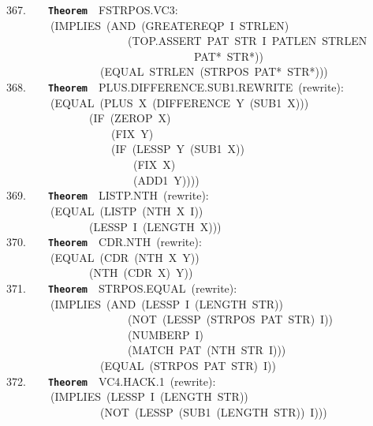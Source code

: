 \documentclass[11pt]{book}
\newenvironment{pubasis}{\begin{flushleft}\ttfamily\small}{\normalsize\rmfamily\end{flushleft}}
\newcommand{\axiomordefinition}[1]{\vspace{6pt}\texttt{\textbf{#1}}}
\begin{document}
\begin{pubasis}
367.~~~~\axiomordefinition{Theorem}~~FSTRPOS.VC3:\\
~~~~~~~~(IMPLIES~(AND~(GREATEREQP~I~STRLEN)\\
~~~~~~~~~~~~~~~~~~~~~~(TOP.ASSERT~PAT~STR~I~PATLEN~STRLEN\\
~~~~~~~~~~~~~~~~~~~~~~~~~~~~~~~~~~PAT*~STR*))\\
~~~~~~~~~~~~~~~~~(EQUAL~STRLEN~(STRPOS~PAT*~STR*)))\\

368.~~~~\axiomordefinition{Theorem}~~PLUS.DIF\-FER\-ENCE.SUB1.REWRITE~(rewrite):\\
~~~~~~~~(EQUAL~(PLUS~X~(DIFFERENCE~Y~(SUB1~X)))\\
~~~~~~~~~~~~~~~(IF~(ZEROP~X)\\
~~~~~~~~~~~~~~~~~~~(FIX~Y)\\
~~~~~~~~~~~~~~~~~~~(IF~(LESSP~Y~(SUB1~X))\\
~~~~~~~~~~~~~~~~~~~~~~~(FIX~X)\\
~~~~~~~~~~~~~~~~~~~~~~~(ADD1~Y))))\\

369.~~~~\axiomordefinition{Theorem}~~LISTP.NTH~(rewrite):\\
~~~~~~~~(EQUAL~(LISTP~(NTH~X~I))\\
~~~~~~~~~~~~~~~(LESSP~I~(LENGTH~X)))\\

370.~~~~\axiomordefinition{Theorem}~~CDR.NTH~(rewrite):\\
~~~~~~~~(EQUAL~(CDR~(NTH~X~Y))\\
~~~~~~~~~~~~~~~(NTH~(CDR~X)~Y))\\

371.~~~~\axiomordefinition{Theorem}~~STRPOS.EQUAL~(rewrite):\\
~~~~~~~~(IMPLIES~(AND~(LESSP~I~(LENGTH~STR))\\
~~~~~~~~~~~~~~~~~~~~~~(NOT~(LESSP~(STRPOS~PAT~STR)~I))\\
~~~~~~~~~~~~~~~~~~~~~~(NUMBERP~I)\\
~~~~~~~~~~~~~~~~~~~~~~(MATCH~PAT~(NTH~STR~I)))\\
~~~~~~~~~~~~~~~~~(EQUAL~(STRPOS~PAT~STR)~I))\\

372.~~~~\axiomordefinition{Theorem}~~VC4.HACK.1~(rewrite):\\
~~~~~~~~(IMPLIES~(LESSP~I~(LENGTH~STR))\\
~~~~~~~~~~~~~~~~~(NOT~(LESSP~(SUB1~(LENGTH~STR))~I)))\\


\end{pubasis}
\end{document}
